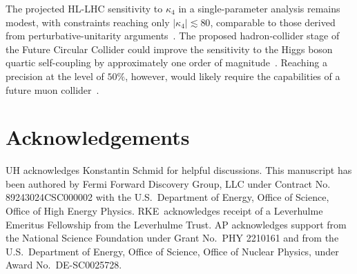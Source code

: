 \documentclass{SciPost}
\providecommand{\DIFaddtex}[1]{{\protect\color{red} #1}} %
\providecommand{\DIFdeltex}[1]{} %
\providecommand{\DIFaddbegin}{} %
\providecommand{\DIFaddend}{} %
\providecommand{\DIFdelbegin}{} %
\providecommand{\DIFdelend}{} %
\providecommand{\DIFadd}[1]{\texorpdfstring{\DIFaddtex{#1}}{#1}} %
\providecommand{\DIFdel}[1]{\texorpdfstring{\DIFdeltex{#1}}{}} %
\begin{document}
The projected HL-LHC sensitivity to $\kappa_4$ in a single-parameter analysis remains modest, with constraints reaching only $|\kappa_4|\lesssim 80$, comparable to those derived from \DIFdelbegin \DIFdel{perturbative unitarity }\DIFdelend \DIFaddbegin \DIFadd{perturbative-unitarity }\DIFaddend arguments~\cite{Liu:2018peg,Stylianou:2023xit,DiLuzio:2017tfn}. \DIFdelbegin \DIFdel{An improvement by approximately one order of magnitude in the determination of the Higgs quartic self-coupling could be achieved at a hadron-collider option of the Future Circular Collider}\DIFdelend \DIFaddbegin \DIFadd{The proposed hadron-collider stage of the Future Circular Collider could improve the sensitivity to the Higgs boson quartic self-coupling by approximately one order of magnitude}\DIFaddend~\cite{Papaefstathiou:2015paa,Chen:2015gva,Fuks:2015hna,Kilian:2017nio,Fuks:2017zkg,Bizon:2018syu,Papaefstathiou:2023uum,Abouabid:2024gms,Dong:2025lkm,Haisch:2025pql,Fuks:2025gjv}. Reaching a precision at the level of $50\%$, however, would likely require the capabilities of a future muon collider~\cite{Chiesa:2020awd}.

\section*{Acknowledgements}
UH acknowledges Konstantin Schmid for helpful discussions. This
manuscript has been authored by Fermi Forward Discovery Group, LLC
under Contract No. 89243024CSC000002 with the U.S.\ Department of
Energy, Office of Science, Office of High Energy
Physics. RKE~acknowledges receipt of a Leverhulme Emeritus Fellowship
from the Leverhulme Trust.
\DIFaddbegin \DIFadd{AP acknowledges support from the National Science Foundation under Grant No.\ PHY 2210161 and from the U.S.\ Department of Energy, Office of Science, Office of Nuclear Physics, under Award No.\ DE-SC0025728.}\DIFaddend

%
%
\end{document}

